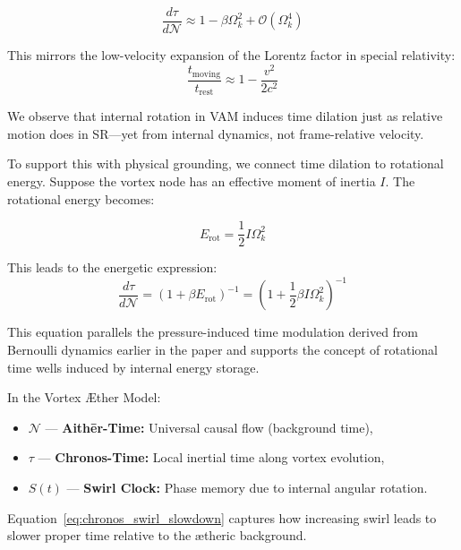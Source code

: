 \begin{equation}
    \frac{d\tau}{d\mathcal{N}} \approx 1 - \beta \Omega_k^2 + \mathcal{O}(\Omega_k^4)
\end{equation}

This mirrors the low-velocity expansion of the Lorentz factor in special relativity:
\begin{equation}
    \frac{t_\text{moving}}{t_\text{rest}} \approx 1 - \frac{v^2}{2c^2}
\end{equation}

We observe that internal rotation in VAM induces time dilation just as relative motion does in SR—yet from internal dynamics, not frame-relative velocity.

To support this with physical grounding, we connect time dilation to rotational energy. Suppose the vortex node has an effective moment of inertia $I$. The rotational energy becomes:

\begin{equation}
    E_\text{rot} = \frac{1}{2} I \Omega_k^2
\end{equation}

This leads to the energetic expression:
\begin{equation}
    \frac{d\tau}{d\mathcal{N}} = \left(1 + \beta E_\text{rot} \right)^{-1}
    = \left(1 + \frac{1}{2} \beta I \Omega_k^2 \right)^{-1}
\end{equation}

This equation parallels the pressure-induced time modulation derived from Bernoulli dynamics earlier in the paper and supports the concept of rotational time wells induced by internal energy storage.

\begin{tcolorbox}[colback=gray!5, colframe=black!70, sharp corners=southwest, title=Temporal Mapping for Vortex Nodes]
In the Vortex Æther Model:
\begin{itemize}
    \item \( \mathcal{N} \) — \textbf{Aithēr-Time:} Universal causal flow (background time),
    \item \( \tau \) — \textbf{Chronos-Time:} Local inertial time along vortex evolution,
    \item \( S(t) \) — \textbf{Swirl Clock:} Phase memory due to internal angular rotation.
\end{itemize}
Equation~\eqref{eq:chronos_swirl_slowdown} captures how increasing swirl leads to slower proper time relative to the ætheric background.
\end{tcolorbox}

